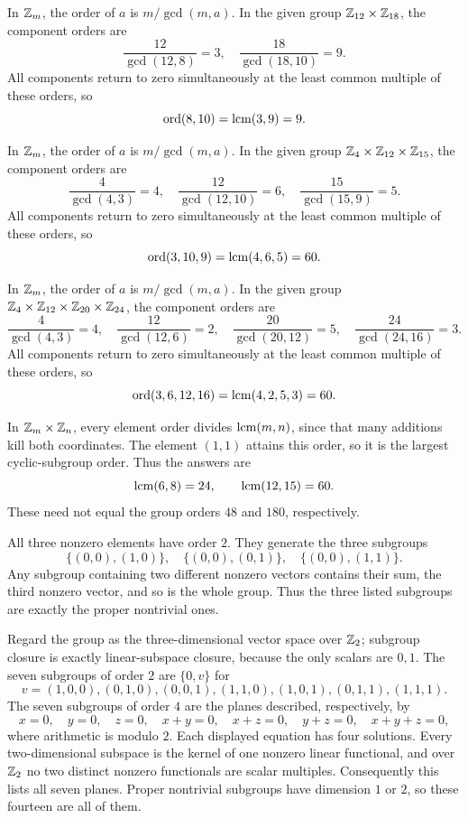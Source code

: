 In $\mathbb{Z}_m$, the order of $a$ is $m/\gcd(m,a)$. In the given group $\mathbb{Z}_{12}\times\mathbb{Z}_{18}$, the component orders are\[\frac{12}{\gcd(12,8)}=3,\quad \frac{18}{\gcd(18,10)}=9.\]All components return to zero simultaneously at the least common multiple of these orders, so\[\operatorname{ord}(8,10)=\operatorname{lcm}(3,9)=9.\]

In $\mathbb{Z}_m$, the order of $a$ is $m/\gcd(m,a)$. In the given group $\mathbb{Z}_{4}\times\mathbb{Z}_{12}\times\mathbb{Z}_{15}$, the component orders are\[\frac{4}{\gcd(4,3)}=4,\quad \frac{12}{\gcd(12,10)}=6,\quad \frac{15}{\gcd(15,9)}=5.\]All components return to zero simultaneously at the least common multiple of these orders, so\[\operatorname{ord}(3,10,9)=\operatorname{lcm}(4,6,5)=60.\]

In $\mathbb{Z}_m$, the order of $a$ is $m/\gcd(m,a)$. In the given group $\mathbb{Z}_{4}\times\mathbb{Z}_{12}\times\mathbb{Z}_{20}\times\mathbb{Z}_{24}$, the component orders are\[\frac{4}{\gcd(4,3)}=4,\quad \frac{12}{\gcd(12,6)}=2,\quad \frac{20}{\gcd(20,12)}=5,\quad \frac{24}{\gcd(24,16)}=3.\]All components return to zero simultaneously at the least common multiple of these orders, so\[\operatorname{ord}(3,6,12,16)=\operatorname{lcm}(4,2,5,3)=60.\]

In $\mathbb{Z}_m\times\mathbb{Z}_n$, every element order divides $\operatorname{lcm}(m,n)$, since that many additions kill both coordinates. The element $(1,1)$ attains this order, so it is the largest cyclic-subgroup order. Thus the answers are
\[\operatorname{lcm}(6,8)=24,\qquad\operatorname{lcm}(12,15)=60.\]
These need not equal the group orders $48$ and $180$, respectively.

All three nonzero elements have order $2$. They generate the three subgroups
\[\{(0,0),(1,0)\},\quad\{(0,0),(0,1)\},\quad\{(0,0),(1,1)\}.\]
Any subgroup containing two different nonzero vectors contains their sum, the third nonzero vector, and so is the whole group. Thus the three listed subgroups are exactly the proper nontrivial ones.

Regard the group as the three-dimensional vector space over $\mathbb{Z}_2$; subgroup closure is exactly linear-subspace closure, because the only scalars are $0,1$. The seven subgroups of order $2$ are $\{0,v\}$ for
\[v=(1,0,0),(0,1,0),(0,0,1),(1,1,0),(1,0,1),(0,1,1),(1,1,1).\]
The seven subgroups of order $4$ are the planes described, respectively, by
\[x=0,\quad y=0,\quad z=0,\quad x+y=0,\quad x+z=0,\quad y+z=0,\quad x+y+z=0,\]
where arithmetic is modulo $2$. Each displayed equation has four solutions. Every two-dimensional subspace is the kernel of one nonzero linear functional, and over $\mathbb{Z}_2$ no two distinct nonzero functionals are scalar multiples. Consequently this lists all seven planes. Proper nontrivial subgroups have dimension $1$ or $2$, so these fourteen are all of them.

